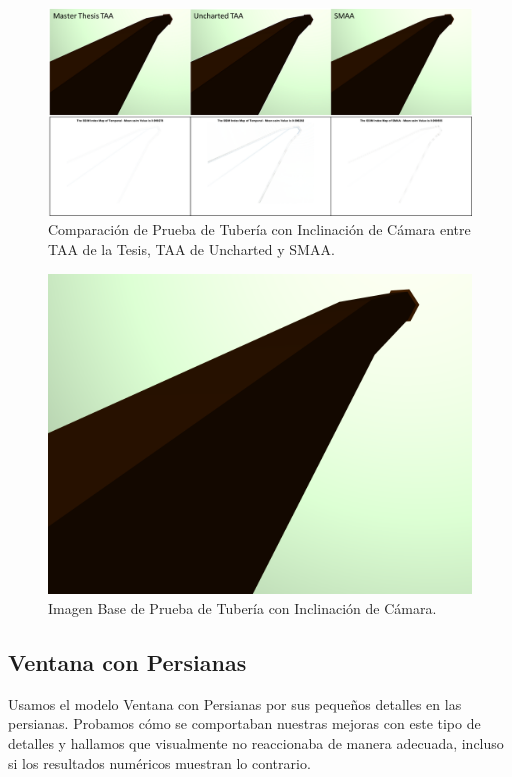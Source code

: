 \documentclass[pregrado]{tesis-usb} %
\begin{document}
\begin{figure}[!htb]
	\centering
	\includegraphics[scale=0.7]{images/results/pipe_inclination.png}
	\caption{Comparación de Prueba de Tubería con Inclinación de Cámara entre TAA de la Tesis, TAA de Uncharted y SMAA.}\label{fig:pipe_inclination_render}
\end{figure}

\begin{figure}[!htb]
	\centering
	\includegraphics[scale=0.2]{images/results/pipe_with_inclination_sobel_ground_truth.png}
	\caption{Imagen Base de Prueba de Tubería con Inclinación de Cámara.}\label{fig:pipe_inclination_truth}
\end{figure}

\FloatBarrier

\subsection{Ventana con Persianas}
Usamos el modelo Ventana con Persianas por sus pequeños detalles en las persianas. Probamos cómo se comportaban nuestras mejoras con este tipo de detalles y hallamos que visualmente no reaccionaba de manera adecuada, incluso si los resultados numéricos muestran lo contrario. 
\end{document}
